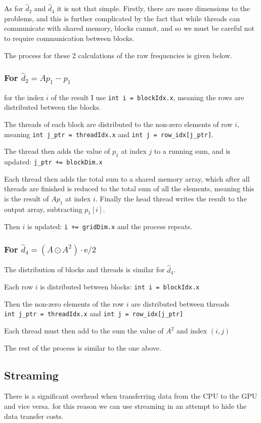 \documentclass[10pt, a4paper]{article}
\begin{document}
As for $\hat{d}_2$ and $\hat{d}_4$ it is not that simple. Firstly, there are more dimensions to the problems,
and this is further complicated by the fact that while threads can communicate with shared memory, 
blocks cannot, and so we must be careful not to require communication between blocks.

The process for these 2 calculations of the raw frequencies is given below.

\subsubsection{For $\hat{d}_2 = A p_1 - p_1$}
for the index $i$ of the result I use \verb|int i = blockIdx.x|, meaning
the rows are distributed between the blocks.

The threads of each block are distributed to the non-zero elements of row $i$, 
meaning \verb|int j_ptr = threadIdx.x| and \verb|int j = row_idx[j_ptr]|.

The thread then adds the value of $p_1$ at index $j$ to a running sum, and is updated:
\verb|j_ptr += blockDim.x|

Each thread then adds the total sum to a shared memory array, which after all threads are finished is
reduced to the total sum of all the elements, meaning this is the result of $A p_1$ at index $i$.
Finally the head thread writes the result to the output array, subtracting $p_1[i]$.

Then $i$ is updated: \verb|i += gridDim.x| and the process repeats.

\subsubsection{For $\hat{d}_4 = (A \odot A^2) \cdot \mathrm{e} / 2$}
The distribution of blocks and threads is similar for $\hat{d}_4$.

Each row $i$ is distributed between blocks: \verb|int i = blockIdx.x|

Then the non-zero elements of the row $i$ are distributed between threads \\
\verb|int j_ptr = threadIdx.x| and \verb|int j = row_idx[j_ptr]|

Each thread must then add to the sum the value of $A^2$ and index $(i, j)$

The rest of the process is similar to the one above.

\subsection{Streaming}
There is a significant overhead when transferring data from the CPU to the GPU and vice versa.
for this reason we can use streaming in an attempt to hide the data transfer costs.
\end{document}
